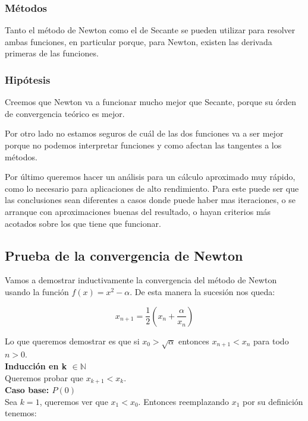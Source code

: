 \subsubsection{Métodos}
Tanto el método de Newton como el de Secante se pueden utilizar para resolver ambas funciones,
en particular porque, para Newton, existen las derivada primeras de las funciones.

\subsubsection{Hipótesis}
Creemos que Newton va a funcionar mucho mejor que Secante, porque su órden de
convergencia teórico es mejor.

Por otro lado no estamos seguros de cuál de las dos funciones va a ser mejor
porque no podemos interpretar funciones y como afectan las tangentes a los
métodos.

Por último queremos hacer un análisis para un cálculo aproximado muy rápido,
como lo necesario para aplicaciones de alto rendimiento. Para este puede ser que las conclusiones sean
diferentes a casos donde puede haber mas iteraciones, o se arranque con aproximaciones buenas del resultado,
o hayan criterios más acotados sobre los que tiene que funcionar.

\subsection{Prueba de la convergencia de Newton}
Vamos a demostrar inductivamente la convergencia del método de Newton usando la función $\displaystyle f(x) = x^2 - \alpha$. De esta manera la sucesión nos queda:

\begin{displaymath}
    x_{n + 1} = \frac{1}{2}(x_n + \frac{\alpha}{x_n})
\end{displaymath}

Lo que queremos demostrar es que si $x_0 > \sqrt{\alpha}$ entonces $x_{n + 1} < x_n$ para todo $n > 0$.\\

{\large \bf Inducción en k $\in \mathbb{N}$}\\
Queremos probar que $x_{k + 1} < x_k$.\\

{\bf Caso base: $P(0)$}\\
Sea $k = 1$, queremos ver que $x_1 < x_0$. Entonces reemplazando $x_1$ por su definición tenemos:

